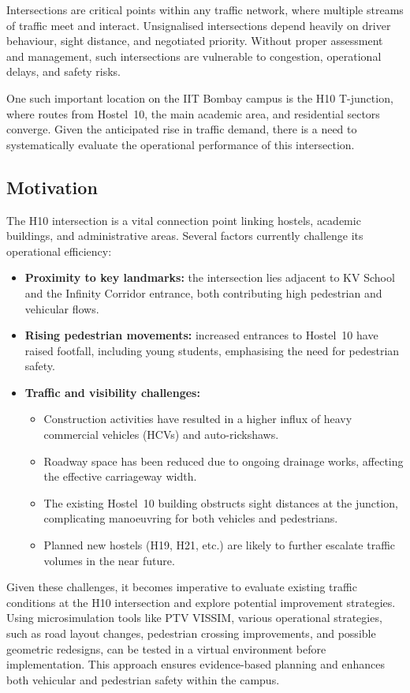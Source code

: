 \documentclass[11pt]{article}
\begin{document}
Intersections are critical points within any traffic network, where multiple streams of traffic meet
and interact. Unsignalised intersections depend heavily on driver behaviour, sight distance, and
negotiated priority. Without proper assessment and management, such intersections are vulnerable to
congestion, operational delays, and safety risks.

One such important location on the IIT Bombay campus is the H10 T-junction, where routes from Hostel~10,
the main academic area, and residential sectors converge. Given the anticipated rise in traffic demand,
there is a need to systematically evaluate the operational performance of this intersection.

\subsection{Motivation}
The H10 intersection is a vital connection point linking hostels, academic buildings, and
administrative areas. Several factors currently challenge its operational efficiency:
\begin{itemize}
  \item \textbf{Proximity to key landmarks:} the intersection lies adjacent to KV School and the
  Infinity Corridor entrance, both contributing high pedestrian and vehicular flows.
  \item \textbf{Rising pedestrian movements:} increased entrances to Hostel~10 have raised footfall,
  including young students, emphasising the need for pedestrian safety.
  \item \textbf{Traffic and visibility challenges:}
  \begin{itemize}
    \item Construction activities have resulted in a higher influx of heavy commercial vehicles (HCVs)
    and auto-rickshaws.
    \item Roadway space has been reduced due to ongoing drainage works, affecting the effective
    carriageway width.
    \item The existing Hostel~10 building obstructs sight distances at the junction, complicating
    manoeuvring for both vehicles and pedestrians.
    \item Planned new hostels (H19, H21, etc.) are likely to further escalate traffic volumes in the
    near future.
  \end{itemize}
\end{itemize}
Given these challenges, it becomes imperative to evaluate existing traffic conditions at the H10
intersection and explore potential improvement strategies. Using microsimulation tools like PTV VISSIM,
various operational strategies, such as road layout changes, pedestrian crossing improvements, and
possible geometric redesigns, can be tested in a virtual environment before implementation. This
approach ensures evidence-based planning and enhances both vehicular and pedestrian safety within the
campus.
\end{document}
